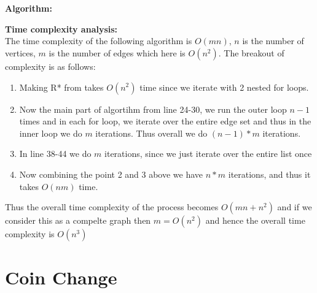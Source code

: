 \documentclass{article}
\begin{document}
\\\\
\textbf{Algorithm:}

\textbf{Time complexity analysis:}\\
The time complexity of the following algorithm is $O(mn)$, $n$ is the number of vertices, $m$ is the number of edges which here is $O(n^2)$. The breakout of complexity is as follows:
\begin{enumerate}
    \item Making R* from takes $O(n^2)$ time since we iterate with 2 nested for loops.
    \item Now the main part of algortihm from line 24-30, we run the outer loop $n-1$ times and in each for loop, we iterate over the entire edge set and thus in the inner loop we do $m$ iterations. Thus overall we do $(n-1)*m$ iterations.
    \item In line 38-44 we do $m$ iterations, since we just iterate over the entire list once
    \item Now combining the point 2 and 3 above we have $n*m$ iterations, and thus it takes $O(nm)$ time.
\end{enumerate}
Thus the overall time complexity of the process becomes $O(mn + n^2)$ and if we consider this as a compelte graph then $m = O(n^2)$ and hence the overall time complexity is $O(n^3)$


\subsection{}



\section{Coin Change}
\end{document}
